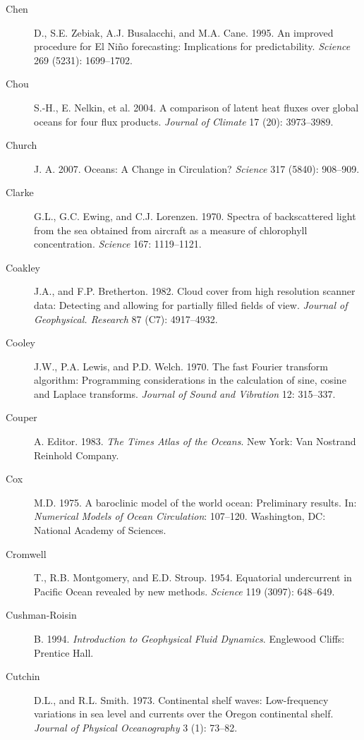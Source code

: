 \begin{description}
\item [Chen]D., S.E. Zebiak, A.J. Busalacchi, and M.A. Cane. 1995. An
  improved procedure for El Ni\~{n}o forecasting: Implications for
  predictability.  \textit{Science} 269 (5231): 1699--1702.

\item [Chou]S.-H., E. Nelkin, et al. 2004. A comparison of latent heat
  fluxes over global oceans for four flux products. \textit{Journal of
    Climate} 17 (20): 3973--3989.

\item [Church]J. A. 2007. Oceans: A Change in Circulation?
  \textit{Science} 317 (5840): 908--909.

\item [Clarke]G.L., G.C. Ewing, and C.J. Lorenzen. 1970. Spectra of
  backscattered light from the sea obtained from aircraft as a measure
  of chlorophyll concentration. \textit{Science} 167: 1119--1121.

\item [Coakley]J.A., and F.P. Bretherton. 1982. Cloud cover from high
  resolution scanner data: Detecting and allowing for partially filled
  fields of view. \textit{Journal of Geophysical. Research} 87 (C7):
  4917--4932.

\item [Cooley]J.W., P.A. Lewis, and P.D. Welch. 1970. The fast Fourier
  transform algorithm: Programming considerations in the calculation
  of sine, cosine and Laplace transforms. \textit{Journal of Sound and
    Vibration} 12: 315--337.

\item [Couper]A. Editor. 1983. \textit{The Times Atlas of the
  Oceans}. New York: Van Nostrand Reinhold Company.

\item [Cox]M.D. 1975. A baroclinic model of the world ocean:
  Preliminary results. In: \textit{Numerical Models of Ocean
    Circulation}: 107--120. Washington, DC: National Academy of
  Sciences.

\item [Cromwell]T., R.B. Montgomery, and E.D. Stroup. 1954. Equatorial
  undercurrent in Pacific Ocean revealed by new
  methods. \textit{Science} 119 (3097): 648--649.

\item[Cushman-Roisin]B. 1994. \textit{Introduction to Geophysical
  Fluid Dynamics}.  Englewood Cliffs: Prentice Hall.

\item[Cutchin]D.L., and R.L. Smith. 1973. Continental shelf waves:
  Low-frequency variations in sea level and currents over the Oregon
  continental shelf. \textit{Journal of Physical Oceanography} 3 (1):
  73--82.


\end{description}
